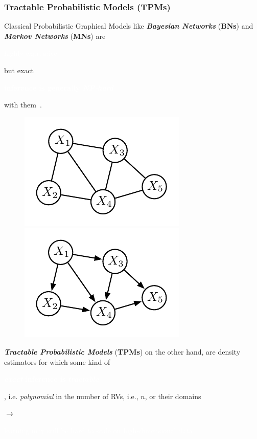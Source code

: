 \documentclass[xcolor={usenames,dvipsnames,svgnames}, compress]{beamer}
\newcommand{\highlighttext}[2][yellow]{{\colorbox{#1}{\strut\textcolor{white}{#2}}}}
\begin{document}
\begin{frame}[t]
  \frametitle{Tractable Probabilistic Models (TPMs)}

  \small
  Classical Probabilistic Graphical Models like \emph{\textbf{Bayesian Networks}}
    (\textbf{BNs}) and \emph{\textbf{Markov Networks}} (\textbf{MNs}) are \highlighttext[lacamlilac]{highly expressive} but
    exact \highlighttext[petroil2]{\textbf{inference is generally
        \emph{NP-hard}}} with them~\parencite{Roth1996}.

    \begin{figure}
      \centering
\includegraphics[width=0.3\linewidth]{figures/mrf} \hspace{30pt} \includegraphics[width=0.3\linewidth]{figures/bn}      
    \end{figure}
\vspace{-5pt}
    \emph{\textbf{Tractable Probabilistic Models} }  (\textbf{TPMs})
    on the other hand, are density estimators for which some kind of  \highlighttext[petroil2]{\textbf{\emph{exact}} \textbf{inference is}
    \textbf{\emph{tractable}}}, i.e. \emph{polynomial} in the number
  of RVs, i.e., $n$, or their
    domains\par
    \hfill$\rightarrow$ \highlighttext[gold4]{learning may still be hard to scale on
    high-dimensional data}\\[20pt]

  
  \end{frame}
\end{document}
